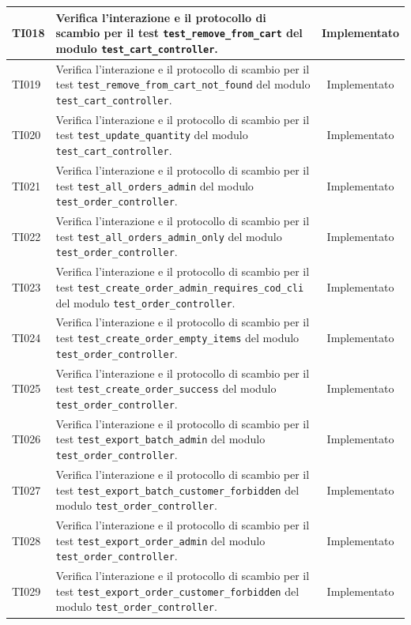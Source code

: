 \documentclass[a4paper,11pt,oneside]{scrartcl}
\begin{document}
\begin{longtable}{|p{1.9cm}|p{11.6cm}|c|}
    TI018 & Verifica l'interazione e il protocollo di scambio per il test \texttt{test\_remove\_from\_cart} del modulo \texttt{test\_cart\_controller}. & Implementato \\ \hline
    TI019 & Verifica l'interazione e il protocollo di scambio per il test \texttt{test\_remove\_from\_cart\_not\_found} del modulo \texttt{test\_cart\_controller}. & Implementato \\ \hline
    TI020 & Verifica l'interazione e il protocollo di scambio per il test \texttt{test\_update\_quantity} del modulo \texttt{test\_cart\_controller}. & Implementato \\ \hline
    TI021 & Verifica l'interazione e il protocollo di scambio per il test \texttt{test\_all\_orders\_admin} del modulo \texttt{test\_order\_controller}. & Implementato \\ \hline
    TI022 & Verifica l'interazione e il protocollo di scambio per il test \texttt{test\_all\_orders\_admin\_only} del modulo \texttt{test\_order\_controller}. & Implementato \\ \hline
    TI023 & Verifica l'interazione e il protocollo di scambio per il test \texttt{test\_create\_order\_admin\_requires\_cod\_cli} del modulo \texttt{test\_order\_controller}. & Implementato \\ \hline
    TI024 & Verifica l'interazione e il protocollo di scambio per il test \texttt{test\_create\_order\_empty\_items} del modulo \texttt{test\_order\_controller}. & Implementato \\ \hline
    TI025 & Verifica l'interazione e il protocollo di scambio per il test \texttt{test\_create\_order\_success} del modulo \texttt{test\_order\_controller}. & Implementato \\ \hline
    TI026 & Verifica l'interazione e il protocollo di scambio per il test \texttt{test\_export\_batch\_admin} del modulo \texttt{test\_order\_controller}. & Implementato \\ \hline
    TI027 & Verifica l'interazione e il protocollo di scambio per il test \texttt{test\_export\_batch\_customer\_forbidden} del modulo \texttt{test\_order\_controller}. & Implementato \\ \hline
    TI028 & Verifica l'interazione e il protocollo di scambio per il test \texttt{test\_export\_order\_admin} del modulo \texttt{test\_order\_controller}. & Implementato \\ \hline
    TI029 & Verifica l'interazione e il protocollo di scambio per il test \texttt{test\_export\_order\_customer\_forbidden} del modulo \texttt{test\_order\_controller}. & Implementato \\ \hline

\end{longtable}
\end{document}
